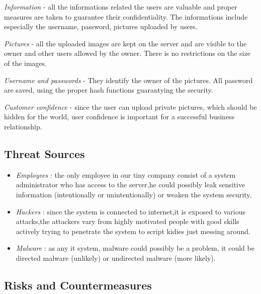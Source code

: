 \textit{Information} - all the informations related the users are valuable and proper measures are taken to guarantee their confidentiality. The informations include especially the username, password, pictures uploaded by users. 


\textit{Pictures} - all the uploaded images are kept on the server and are visible to the owner and other users allowed by the owner. There is no restrictions on the size of the images.


\textit{Username and passwords} - They identify the owner of the pictures. All password are saved, using the proper hash functions guarantying the security. 


\textit{Customer confidence} - since the user can upload private pictures, which should be hidden for the world, user confidence is important for a successful business relationship.

\subsection{Threat Sources}



\begin{itemize}
  \item \textit{Employees} : the only employee in our tiny company consist of a system administrator who has access to the server,he could possibly leak sensitive information (intentionally or unintentionally) or weaken the system security.
  \item \textit{Hackers} : since the system is connected to internet,it is exposed to various attacks,the attackers vary from highly motivated people with good skills actively trying to penetrate the system to script kidies just messing around.
  \item \textit{Malware} : as any it system, malware could possibly be a problem, it could be directed malware (unlikely) or undirected malware (more likely).
\end{itemize}



\subsection{Risks and Countermeasures}





